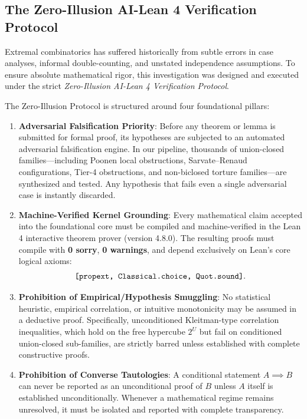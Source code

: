 \documentclass[11pt,a4paper]{article}
\theoremstyle{plain}
\theoremstyle{definition}
\theoremstyle{remark}
\begin{document}
\subsection{The Zero-Illusion AI-Lean 4 Verification Protocol}

Extremal combinatorics has suffered historically from subtle errors in case analyses, informal double-counting, and unstated independence assumptions. To ensure absolute mathematical rigor, this investigation was designed and executed under the strict \emph{Zero-Illusion AI-Lean 4 Verification Protocol}.

The Zero-Illusion Protocol is structured around four foundational pillars:
\begin{enumerate}
    \item \textbf{Adversarial Falsification Priority}: Before any theorem or lemma is submitted for formal proof, its hypotheses are subjected to an automated adversarial falsification engine. In our pipeline, thousands of union-closed families—including Poonen local obstructions, Sarvate--Renaud configurations, Tier-4 obstructions, and non-biclosed torture families—are synthesized and tested. Any hypothesis that fails even a single adversarial case is instantly discarded.
    \item \textbf{Machine-Verified Kernel Grounding}: Every mathematical claim accepted into the foundational core must be compiled and machine-verified in the Lean 4 interactive theorem prover (version 4.8.0). The resulting proofs must compile with \textbf{0 sorry}, \textbf{0 warnings}, and depend exclusively on Lean's core logical axioms:
    \begin{equation}
    \texttt{[\text{propext}, \text{Classical.choice}, \text{Quot.sound}]}.
    \end{equation}
    \item \textbf{Prohibition of Empirical/Hypothesis Smuggling}: No statistical heuristic, empirical correlation, or intuitive monotonicity may be assumed in a deductive proof. Specifically, unconditioned Kleitman-type correlation inequalities, which hold on the free hypercube $2^U$ but fail on conditioned union-closed sub-families, are strictly barred unless established with complete constructive proofs.
    \item \textbf{Prohibition of Converse Tautologies}: A conditional statement $A \implies B$ can never be reported as an unconditional proof of $B$ unless $A$ itself is established unconditionally. Whenever a mathematical regime remains unresolved, it must be isolated and reported with complete transparency.
\end{enumerate}
\end{document}
